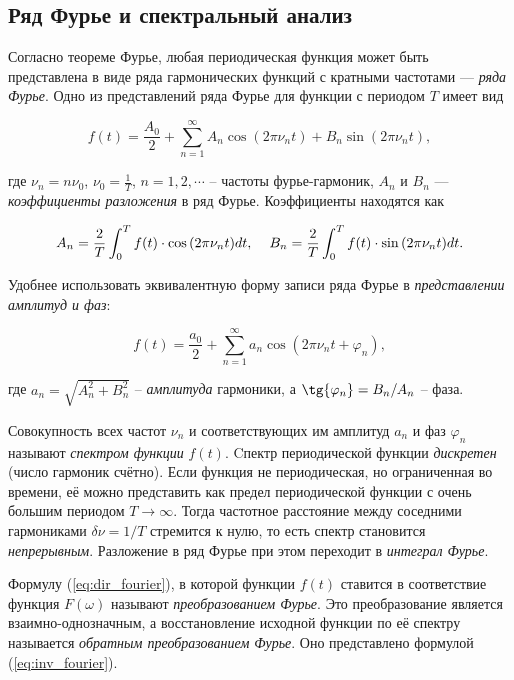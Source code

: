 \documentclass[a4paper, 12pt]{article}
\begin{document}
    \subsection{Ряд Фурье и спектральный анализ}

    Согласно теореме Фурье, любая периодическая функция может быть представлена в виде ряда гармонических функций с кратными частотами — \textit{ряда Фурье}. Одно из представлений ряда Фурье для функции с периодом $T$ имеет вид

    \begin{equation}
        f(t) = \frac{A_0}{2} + \sum_{n=1}^{\infty} A_n \cos{(2\pi \nu_n t)} + B_n \sin{(2\pi \nu_n t)}, 
    \end{equation}

    где $\nu_n = n \nu_0$, $\nu_0 = \frac{1}{T}$, $n = 1,2, \cdots$ -- частоты фурье-гармоник, $A_n$ и $B_n$ — \textit{коэффициенты разложения} в ряд Фурье. Коэффициенты находятся как

    \begin{equation}
        A_n = \frac{2}{T} \int_{0}^T f(t) \cdot \cos{(2\pi \nu_n t)} dt, \hspace{4 mm} B_n = \frac{2}{T} \int_{0}^T f(t) \cdot \sin{(2\pi \nu_n t)} dt.
    \end{equation}

    Удобнее использовать эквивалентную форму записи ряда Фурье в \textit{представлении амплитуд и фаз}:

    \begin{equation}
        f(t) = \frac{a_0}{2} + \sum_{n=1}^{\infty} a_n \cos{(2\pi \nu_n t + \varphi_n)},
    \end{equation}

    где $a_n = \sqrt{A_n^2 + B_n^2}$ -- \textit{амплитуда} гармоники, а $\tg{\varphi_n} = B_n / A_n$ -- фаза.

    Совокупность всех частот $\nu_n$ и соответствующих им амплитуд $a_n$ и фаз $\varphi_n$ называют \textit{спектром функции} $f(t)$. Cпектр периодической функции \textit{дискретен} (число гармоник счётно). Если функция не периодическая, но ограниченная во времени, её можно представить как предел периодической функции с очень большим периодом $T \rightarrow \infty$. Тогда частотное расстояние между соседними гармониками $\delta \nu = 1/T$ стремится к нулю, то есть спектр становится \textit{непрерывным}. Разложение в ряд Фурье при этом переходит в \textit{интеграл Фурье}.

    Формулу (\ref{eq:dir_fourier}), в которой функции $f(t)$ ставится в соответствие функция $F(\omega)$ называют \textit{преобразованием Фурье}. Это преобразование является взаимно-однозначным, а восстановление исходной функции по её спектру называется \textit{обратным преобразованием Фурье}. Оно представлено формулой (\ref{eq:inv_fourier}).
\end{document}
